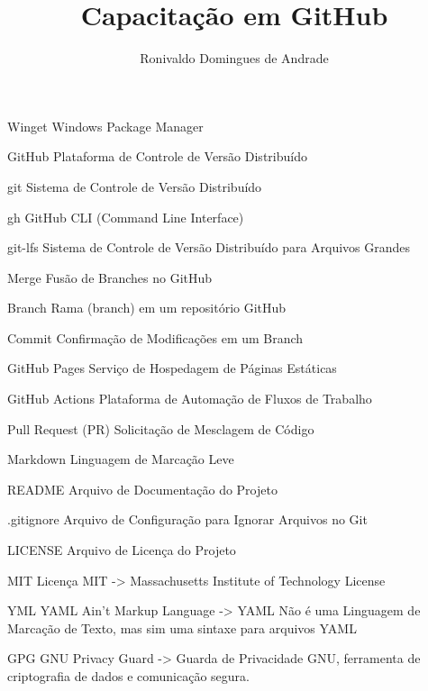 \documentclass[12pt, a4paper, openright, oneside, brazil]{abntex2}
\title{Capacitação em GitHub}
\author{Ronivaldo Domingues de Andrade}
\begin{document}

\imprimircapa
\imprimirfolhaderosto

\newpage
\listoffigures

\newpage
\listoftables

\begin{siglas}
  \item[Winget] Windows Package Manager
  \item[GitHub] Plataforma de Controle de Versão Distribuído
  \item[git] Sistema de Controle de Versão Distribuído
  \item[gh] GitHub CLI (Command Line Interface)
  \item[git-lfs] Sistema de Controle de Versão Distribuído para Arquivos Grandes
  \item[Merge] Fusão de Branches no GitHub
  \item[Branch] Rama (branch) em um repositório GitHub
  \item[Commit] Confirmação de Modificações em um Branch
  \item[GitHub Pages] Serviço de Hospedagem de Páginas Estáticas
  \item[GitHub Actions] Plataforma de Automação de Fluxos de Trabalho
  \item[Pull Request (PR)] Solicitação de Mesclagem de Código
  \item[Markdown] Linguagem de Marcação Leve
  \item[README] Arquivo de Documentação do Projeto
  \item[.gitignore] Arquivo de Configuração para Ignorar Arquivos no Git
  \item[LICENSE] Arquivo de Licença do Projeto
  \item[MIT] Licença MIT -> Massachusetts Institute of Technology License
  \item[YML] YAML Ain't Markup Language -> YAML Não é uma Linguagem de Marcação de Texto, mas sim uma sintaxe para arquivos YAML
  \item[GPG] GNU Privacy Guard -> Guarda de Privacidade GNU, ferramenta de criptografia de dados e comunicação segura.
\end{siglas}

\tableofcontents







\end{document}
